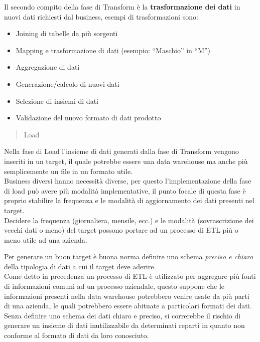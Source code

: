 \documentclass[]{article}
\providecommand{\tightlist}{%
  \setlength{\itemsep}{0pt}\setlength{\parskip}{0pt}}
\begin{document}
Il secondo compito della fase di Transform è la \textbf{trasformazione
dei dati} in nuovi dati richiesti dal business, esempi di trasformazioni
sono:

\begin{itemize}
\tightlist
\item
  Joining di tabelle da più sorgenti
\item
  Mapping e trasformazione di dati (esempio: ``Maschio'' in ``M'')
\item
  Aggregazione di dati
\item
  Generazione/calcolo di nuovi dati
\item
  Selezione di insiemi di dati
\item
  Validazione del nuovo formato di dati prodotto
\end{itemize}

\begin{quote}
Load
\end{quote}

Nella fase di Load l'insieme di dati generati dalla fase di Transform
vengono inseriti in un target, il quale potrebbe essere una data
warehouse ma anche più semplicemente un file in un formato utile.\\
Business diversi hanno necessità diverse, per questo l'implementazione
della fase di load può avere più modalità implementative, il punto
focale di questa fase è proprio stabilire la frequenza e le modalità di
aggiornamento dei dati presenti nel target.\\
Decidere la frequenza (giornaliera, mensile, ecc.) e le modalità
(sovrascrizione dei vecchi dati o meno) del target possono portare ad un
processo di ETL più o meno utile ad una azienda.

Per generare un buon target è buona norma definire uno schema
\emph{preciso e chiaro} della tipologia di dati a cui il target deve
aderire.\\
Come detto in precedenza un processo di ETL è utilizzato per aggregare
più fonti di informazioni comuni ad un processo aziendale, questo
suppone che le informazioni presenti nella data warehouse potrebbero
venire usate da più parti di una azienda, le quali potrebbero essere
abituate a particolari formati dei dati.\\
Senza definire uno schema dei dati chiaro e preciso, si correrebbe il
rischio di generare un insieme di dati inutilizzabile da determinati
reparti in quanto non conforme al formato di dati da loro conosciuto.

\newpage
\end{document}
